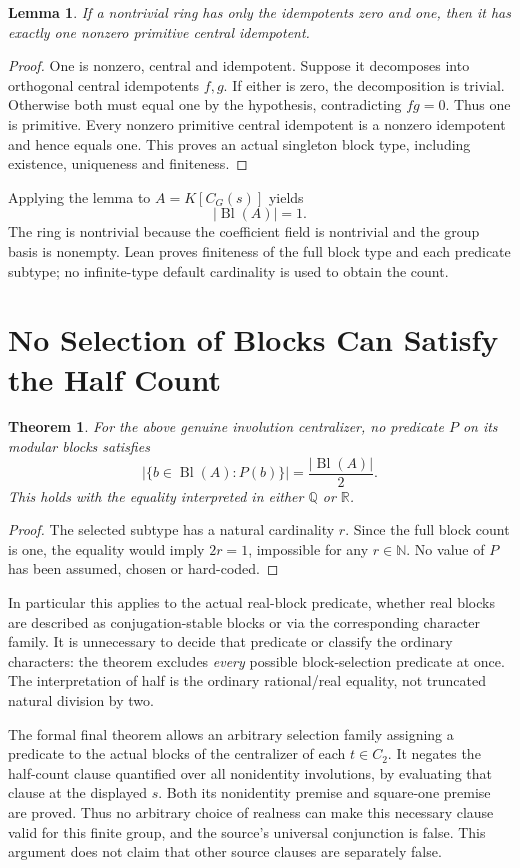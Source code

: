 \documentclass[11pt]{article}
\newtheorem{theorem}{Theorem}
\newtheorem{lemma}{Lemma}
\newcommand{\N}{\mathbb N}
\newcommand{\Bl}{\operatorname{Bl}}
\begin{document}
\begin{lemma}
If a nontrivial ring has only the idempotents zero and one, then it has
exactly one nonzero primitive central idempotent.
\end{lemma}
\begin{proof}
One is nonzero, central and idempotent. Suppose it decomposes into
orthogonal central idempotents $f,g$. If either is zero, the decomposition
is trivial. Otherwise both must equal one by the hypothesis, contradicting
$fg=0$. Thus one is primitive. Every nonzero primitive central idempotent
is a nonzero idempotent and hence equals one. This proves an actual
singleton block type, including existence, uniqueness and finiteness.
\end{proof}

Applying the lemma to $A=K[C_G(s)]$ yields
\[
 |\Bl(A)|=1.
\]
The ring is nontrivial because the coefficient field is nontrivial and
the group basis is nonempty. Lean proves finiteness of the full block
type and each predicate subtype; no infinite-type default cardinality
is used to obtain the count.

\section{No Selection of Blocks Can Satisfy the Half Count}
\begin{theorem}
For the above genuine involution centralizer, no predicate $P$ on its
modular blocks satisfies
\[
 |\{b\in\Bl(A):P(b)\}|=\frac{|\Bl(A)|}{2}.
\]
This holds with the equality interpreted in either $\mathbb Q$ or
$\mathbb R$.
\end{theorem}
\begin{proof}
The selected subtype has a natural cardinality $r$. Since the full block
count is one, the equality would imply $2r=1$, impossible for any
$r\in\N$. No value of $P$ has been assumed, chosen or hard-coded.
\end{proof}

In particular this applies to the actual real-block predicate, whether
real blocks are described as conjugation-stable blocks or via the
corresponding character family. It is unnecessary to decide that
predicate or classify the ordinary characters: the theorem excludes
\emph{every} possible block-selection predicate at once. The interpretation
of half is the ordinary rational/real equality, not truncated natural
division by two.

The formal final theorem allows an arbitrary selection family assigning a
predicate to the actual blocks of the centralizer of each $t\in C_2$.
It negates the half-count clause quantified over all nonidentity
involutions, by evaluating that clause at the displayed $s$. Both its
nonidentity premise and square-one premise are proved. Thus no arbitrary
choice of realness can make this necessary clause valid for this finite
group, and the source's universal conjunction is false. This argument
does not claim that other source clauses are separately false.
\end{document}
